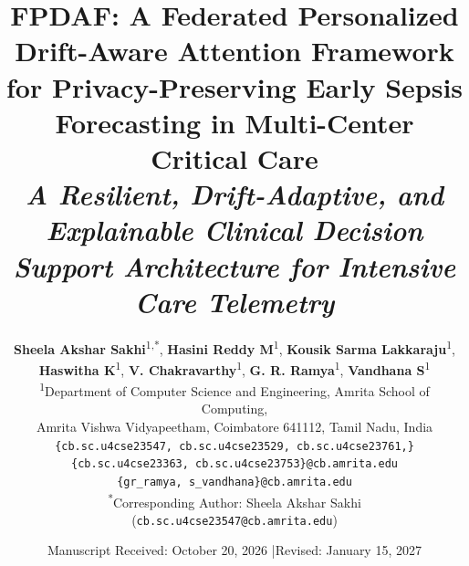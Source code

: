 \documentclass[10pt,a4paper,twocolumn,twoside]{article}
\begin{document}
\title{\LARGE\textbf{FPDAF: A Federated Personalized Drift-Aware Attention Framework for Privacy-Preserving Early Sepsis Forecasting in Multi-Center Critical Care}\\[0.2cm]
\large\textit{A Resilient, Drift-Adaptive, and Explainable Clinical Decision Support Architecture for Intensive Care Telemetry}}

\author{
\textbf{Sheela Akshar Sakhi}\textsuperscript{1,*}, 
\textbf{Hasini Reddy M}\textsuperscript{1}, 
\textbf{Kousik Sarma Lakkaraju}\textsuperscript{1},\\
\textbf{Haswitha K}\textsuperscript{1}, 
\textbf{V. Chakravarthy}\textsuperscript{1}, 
\textbf{G. R. Ramya}\textsuperscript{1}, 
\textbf{Vandhana S}\textsuperscript{1}\\[0.25cm]
\textsuperscript{1}Department of Computer Science and Engineering, Amrita School of Computing,\\
Amrita Vishwa Vidyapeetham, Coimbatore 641112, Tamil Nadu, India\\[0.15cm]
\small\texttt{\{cb.sc.u4cse23547, cb.sc.u4cse23529, cb.sc.u4cse23761,\}}\\[-0.05cm]
\small\texttt{\{cb.sc.u4cse23363, cb.sc.u4cse23753\}@cb.amrita.edu}\\[0.1cm]
\small\texttt{\{gr\_ramya, s\_vandhana\}@cb.amrita.edu}\\[0.15cm]
\small\textsuperscript{*}Corresponding Author: Sheela Akshar Sakhi (\texttt{cb.sc.u4cse23547@cb.amrita.edu})
}

\date{\small Manuscript Received: October 20, 2026 \quad|\quad Revised: January 15, 2027}

\maketitle
\end{document}
